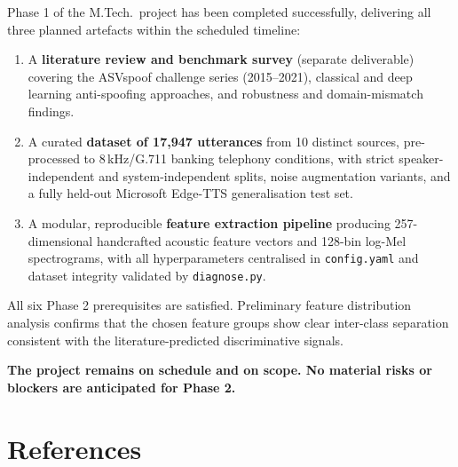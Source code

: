 \documentclass[12pt,a4paper]{report}
\begin{document}
Phase 1 of the M.Tech.\ project has been completed successfully, delivering all three
planned artefacts within the scheduled timeline:

\begin{enumerate}
  \item A \textbf{literature review and benchmark survey} (separate deliverable) covering
    the ASVspoof challenge series (2015--2021), classical and deep learning anti-spoofing
    approaches, and robustness and domain-mismatch findings.
  \item A curated \textbf{dataset of 17{,}947 utterances} from 10 distinct sources,
    pre-processed to 8\,kHz/G.711 banking telephony conditions, with strict
    speaker-independent and system-independent splits, noise augmentation variants,
    and a fully held-out Microsoft Edge-TTS generalisation test set.
  \item A modular, reproducible \textbf{feature extraction pipeline} producing
    257-dimensional handcrafted acoustic feature vectors and 128-bin log-Mel spectrograms,
    with all hyperparameters centralised in \texttt{config.yaml} and dataset integrity
    validated by \texttt{diagnose.py}.
\end{enumerate}

All six Phase 2 prerequisites are satisfied. Preliminary feature distribution analysis
confirms that the chosen feature groups show clear inter-class separation consistent with
the literature-predicted discriminative signals.

\textbf{The project remains on schedule and on scope. No material risks or blockers are
anticipated for Phase 2.}

\chapter*{References}
\end{document}
